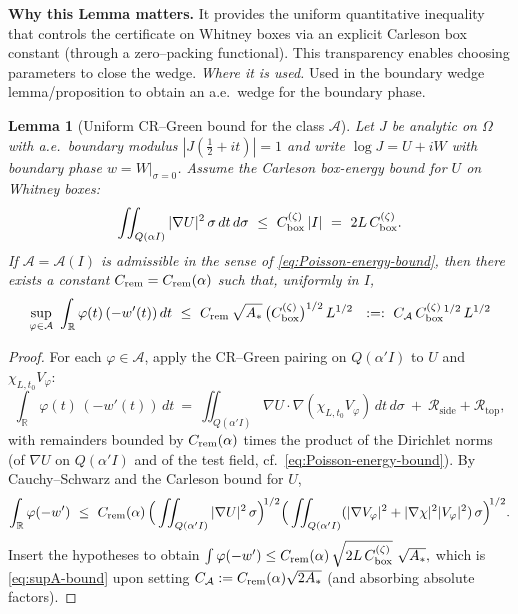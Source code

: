 \documentclass[11pt]{article}
\newtheorem{lemma}{Lemma}[section]
\theoremstyle{definition}
\theoremstyle{remark}
\newcommand{\R}{\mathbb{R}}
\begin{document}
\noindent\textbf{Why this Lemma matters.} It provides the uniform quantitative inequality that controls the certificate on Whitney boxes via an explicit Carleson box constant (through a zero--packing functional). This transparency enables choosing parameters to close the wedge.
\noindent\textit{Where it is used.} Used in the boundary wedge lemma/proposition to obtain an a.e.\ wedge for the boundary phase.
\begin{lemma}[Uniform CR--Green bound for the class \(\mathcal A\)]
\label{lem:uniform-CRG-A}
Let \(J\) be analytic on \(\Omega\) with a.e.\ boundary modulus \(|J(\tfrac12+it)|=1\) and write \(\log J=U+iW\) with boundary phase \(w=W|_{\sigma=0}\).
Assume the Carleson box-energy bound for \(U\) on Whitney boxes:
\[
  \iint_{Q(\alpha I)} |\nabla U|^2\,\sigma\,dt\,d\sigma \ \le\ C_{\rm box}^{(\zeta)}\,|I|\ =\ 2L\,C_{\rm box}^{(\zeta)}.
\]
If \(\mathcal A=\mathcal A(I)\) is admissible in the sense of \eqref{eq:Poisson-energy-bound},
then there exists a constant \(C_{\rm rem}=C_{\rm rem}(\alpha)\) such that, uniformly in \(I\),
\begin{equation}\label{eq:supA-bound}
  \sup_{\varphi\in\mathcal A}\ \int_{\R} \varphi(t)\,(-w'(t))\,dt
  \ \le\ C_{\rm rem}\,\sqrt{A_\ast}\,\big(C_{\rm box}^{(\zeta)}\big)^{1/2}\,L^{1/2}
  \ \ :=:\ C_{\mathcal A}\,C_{\rm box}^{(\zeta)}{}^{1/2}\,L^{1/2}
\end{equation}
\end{lemma}


\begin{proof}
For each \(\varphi\in\mathcal A\), apply the CR--Green pairing on \(Q(\alpha'I)\) to \(U\) and \(\chi_{L,t_0}V_\varphi\):
\[
  \int_{\R}\varphi(t)\,(-w'(t))\,dt
  \ =\ \iint_{Q(\alpha'I)} \nabla U\cdot\nabla(\chi_{L,t_0}V_\varphi)\,dt\,d\sigma\ +\ \mathcal R_{\mathrm{side}}+\mathcal R_{\mathrm{top}},
\]
with remainders bounded by \(C_{\rm rem}(\alpha)\) times the product of the Dirichlet norms
(of \(\nabla U\) on \(Q(\alpha'I)\) and of the test field, cf.\ \eqref{eq:Poisson-energy-bound}).
By Cauchy--Schwarz and the Carleson bound for \(U\),
\[
  \int_{\R}\varphi(-w') \ \le\ C_{\rm rem}(\alpha)\,
  \Big(\iint_{Q(\alpha'I)} |\nabla U|^2\,\sigma\Big)^{\!1/2}
  \Big(\iint_{Q(\alpha'I)} (|\nabla V_\varphi|^2+|\nabla\chi|^2|V_\varphi|^2)\,\sigma\Big)^{\!1/2}.
\]
Insert the hypotheses to obtain
\(
\int \varphi(-w') \le C_{\rm rem}(\alpha)\,\sqrt{2L\,C_{\rm box}^{(\zeta)}}\ \sqrt{A_\ast},
\)
which is \eqref{eq:supA-bound} upon setting \(C_{\mathcal A}:=C_{\rm rem}(\alpha)\sqrt{2A_\ast}\) (and absorbing absolute factors).
\end{proof}
\end{document}
